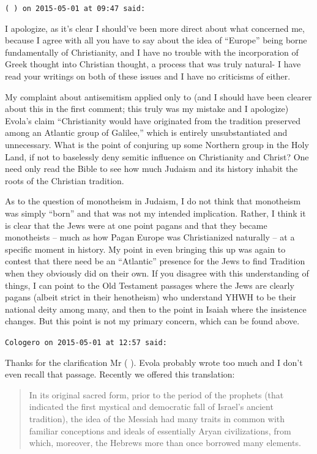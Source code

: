 \begin{footnotesize}
\begin{sffamily}
\hfill

\texttt{( ) on 2015-05-01 at 09:47 said:}

I apologize, as it's clear I should've been more direct about what concerned me, because I agree with all you have to say about the idea of ``Europe'' being borne fundamentally of Christianity, and I have no trouble with the incorporation of Greek thought into Christian thought, a process that was truly natural- I have read your writings on both of these issues and I have no criticisms of either.

My complaint about antisemitism applied only to (and I should have been clearer about this in the first comment; this truly was my mistake and I apologize) Evola's claim ``Christianity would have originated from the tradition preserved among an Atlantic group of Galilee,'' which is entirely unsubstantiated and unnecessary. What is the point of conjuring up some Northern group in the Holy Land, if not to baselessly deny semitic influence on Christianity and Christ? One need only read the Bible to see how much Judaism and its history inhabit the roots of the Christian tradition.

As to the question of monotheism in Judaism, I do not think that monotheism was simply ``born'' and that was not my intended implication. Rather, I think it is clear that the Jews were at one point pagans and that they became monotheists -- much as how Pagan Europe was Christianized naturally -- at a specific moment in history. My point in even bringing this up was again to contest that there need be an ``Atlantic'' presence for the Jews to find Tradition when they obviously did on their own. If you disagree with this understanding of things, I can point to the Old Testament passages where the Jews are clearly pagans (albeit strict in their henotheism) who understand YHWH to be their national deity among many, and then to the point in Isaiah where the insistence changes. But this point is not my primary concern, which can be found above.

\hfill

\texttt{Cologero on 2015-05-01 at 12:57 said:}

Thanks for the clarification Mr ( ). Evola probably wrote too much and I don't even recall that passage. Recently we offered this translation:

\begin{quote}\footnotesize

In its original sacred form, prior to the period of the prophets (that indicated the first mystical and democratic fall of Israel's ancient tradition), the idea of the Messiah had many traits in common with familiar conceptions and ideals of essentially Aryan civilizations, from which, moreover, the Hebrews more than once borrowed many elements.
\end{quote}



\end{sffamily}
\end{footnotesize}
